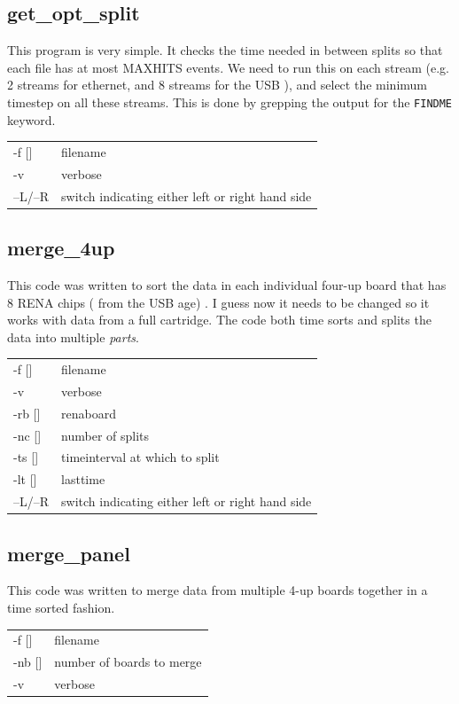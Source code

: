 \documentclass[12pt]{article}
\begin{document}
\subsection{get\_opt\_split}
This program is very simple. It checks the time needed in between splits so that each file has at most MAXHITS events. We need to run this on each stream (e.g. 2 streams for ethernet, and 8 streams for the USB ), and select the minimum timestep on all these streams. This is done by grepping the output for the {\tt FINDME} keyword. \\

\begin{tabular}{ll}
-f []& filename\\
-v & verbose\\
--L/--R & switch indicating either left or right hand side\\
\end{tabular}

\subsection{merge\_4up}
This code was written to sort the data in each individual four-up board that has 8 RENA chips ( from the USB age) . I guess now it needs to be changed so it works with data from a full cartridge. The code both time sorts and splits the data into multiple {\em parts}. \\

\begin{tabular}{ll}
-f []& filename\\
-v & verbose\\
-rb []& renaboard\\
-nc []& number of splits\\
-ts []& timeinterval at which to split\\
-lt []& lasttime \\
--L/--R & switch indicating either left or right hand side\\
\end{tabular}


\subsection{merge\_panel}
This code was written to merge data from multiple 4-up boards together in a time sorted fashion. \\

\begin{tabular}{ll}
-f []&filename\\
-nb [] & number of boards to merge\\
-v & verbose\\
\end{tabular}
\end{document}
